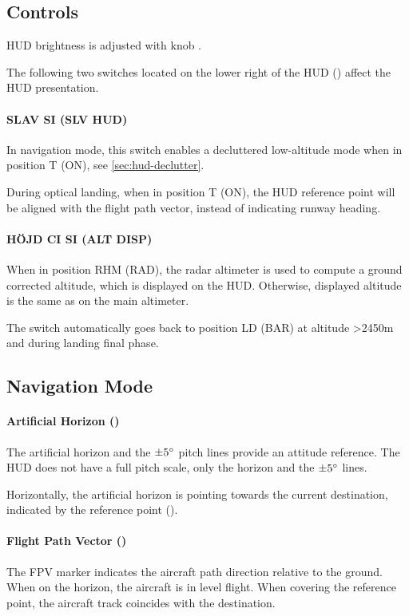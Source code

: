 \subsection{Controls}
HUD brightness is adjusted with knob .

The following two switches located on the lower right of the HUD
() affect the HUD presentation.

\paragraph{SLAV SI (SLV HUD)}
\label{sec:hud-slav-switch}
In navigation mode, this switch enables a decluttered low-altitude mode when
in position T (ON), see \cref{sec:hud-declutter}.

During optical landing, when in position T (ON), the HUD reference point will
be aligned with the flight path vector, instead of indicating runway heading.

\paragraph{HÖJD CI SI (ALT DISP)}
\label{sec:hud-alt-switch}
When in position RHM (RAD), the radar altimeter is used to compute a ground
corrected altitude, which is displayed on the HUD.
Otherwise, displayed altitude is the same as on the main altimeter.

The switch automatically goes back to position LD (BAR) at altitude >2450m
and during landing final phase.

\subsection{Navigation Mode}
\label{sec:hud-nav}
\paragraph{Artificial Horizon ()}
The artificial horizon and the $\pm 5 \degree$ pitch lines provide an attitude reference.
The HUD does not have a full pitch scale, only the horizon and the $\pm 5 \degree$ lines.

Horizontally, the artificial horizon is pointing towards the current destination,
indicated by the reference point ().

\paragraph{Flight Path Vector ()}
The FPV marker indicates the aircraft path direction relative to the ground.
When on the horizon, the aircraft is in level flight.
When covering the reference point, the aircraft track coincides with the destination.

